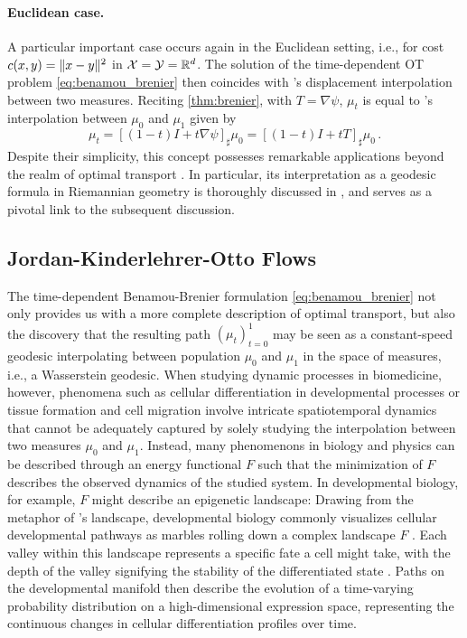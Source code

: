 \paragraph{Euclidean case.} A particular important case occurs again in the Euclidean setting, i.e., for cost $c(x, y) = \lVert x-y\rVert^2$ in ${\mathcal{X}} = {\mathcal{Y}} = \mathbb{R}^d$. The solution of the time-dependent OT problem \eqref{eq:benamou_brenier} then coincides with \citeauthor{mccann1997convexity}'s displacement interpolation between two measures.
Reciting \cref{thm:brenier}, with $T = \nabla \psi$, $\mu_t$ is equal to \citeauthor{mccann1997convexity}'s interpolation between $\mu_0$ and $\mu_1$ given by
\begin{equation} \label{eq:mccann_interpolation}
	\mu_t = [(1-t) I+t \nabla \psi]_\sharp \mu_0 = [(1-t) I+t T]_\sharp \mu_0\,.
\end{equation}
Despite their simplicity, this concept possesses remarkable applications beyond the realm of optimal transport \citep{bonneel2011displacement}. In particular, its interpretation as a geodesic formula in Riemannian geometry is thoroughly discussed in \citet{gangbo1996geometry}, and serves as a pivotal link to the subsequent discussion.


\subsection{Jordan-Kinderlehrer-Otto Flows} \label{sec:background_jko}

The time-dependent Benamou-Brenier formulation \eqref{eq:benamou_brenier} not only provides us with a more complete description of optimal transport, but also the discovery that the resulting path $(\mu_t)_{t=0}^1$ may be seen as a constant-speed geodesic interpolating between population $\mu_0$ and $\mu_1$ in the space of measures, i.e., a Wasserstein geodesic.
When studying dynamic processes in biomedicine, however, phenomena such as cellular differentiation in developmental processes or tissue formation and cell migration involve intricate spatiotemporal dynamics that cannot be adequately captured by solely studying the interpolation between two measures $\mu_0$ and $\mu_1$.
Instead, many phenomenons in biology and physics can be described through an energy functional $F$ such that the minimization of $F$ describes the observed dynamics of the studied system.
In developmental biology, for example, $F$ might describe an epigenetic landscape: Drawing from the metaphor of \citeauthor{waddington1957strategy}'s landscape, developmental biology commonly visualizes cellular developmental pathways as marbles rolling down a complex landscape $F$ \citep{waddington1957strategy}.
Each valley within this landscape represents a specific fate a cell might take, with the depth of the valley signifying the stability of the differentiated state \citep{schiebinger2021reconstructing}.
Paths on the developmental manifold then describe the evolution of a time-varying probability distribution on a high-dimensional expression space, representing the continuous changes in cellular differentiation profiles over time.

